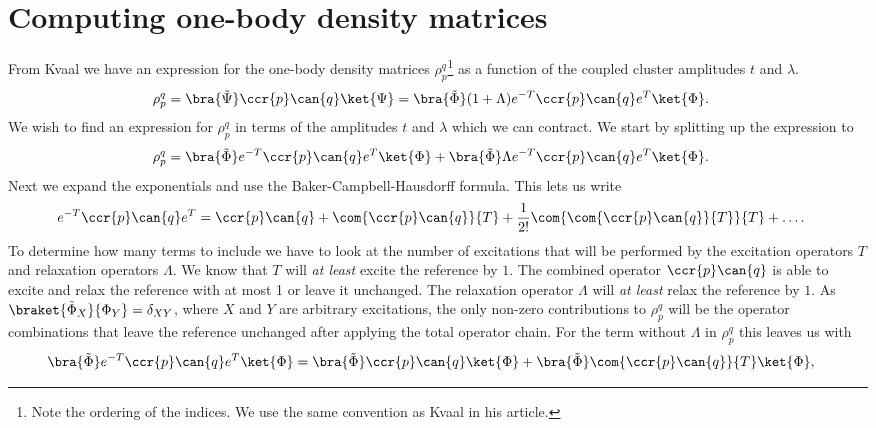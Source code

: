 \chapter{Computing one-body density matrices}
    From Kvaal\cite{kvaal2012ab} we have an expression for the one-body density
    matrices $\rho^q_p$\footnote{Note the ordering of the indices. We use the
    same convention as Kvaal in his article.} as a function of the coupled
    cluster amplitudes $t$ and $\lambda$.
    \begin{align}
        \rho^{q}_{p}
        &= \bra{\tilde{\Psi}}\ccr{p}\can{q}\ket{\Psi}
        = \bra{\tilde{\Phi}}(1 + \Lambda)e^{-T}\ccr{p}\can{q}e^T\ket{\Phi}.
    \end{align}
    We wish to find an expression for $\rho^{q}_{p}$ in terms of the amplitudes
    $t$ and $\lambda$ which we can contract. We start by splitting up the
    expression to
    \begin{align}
        \rho^q_p
        &= \bra{\tilde{\Phi}}e^{-T}\ccr{p}\can{q}e^T\ket{\Phi}
        + \bra{\tilde{\Phi}}\Lambda e^{-T}\ccr{p}\can{q}e^T\ket{\Phi}.
    \end{align}
    Next we expand the exponentials and use the Baker-Campbell-Hausdorff
    formula. This lets us write
    \begin{align}
        e^{-T}\ccr{p}\can{q}e^T
        &= \ccr{p}\can{q}
        + \com{\ccr{p}\can{q}}{T}
        + \frac{1}{2!}\com{\com{\ccr{p}\can{q}}{T}}{T}
        + \dots.
    \end{align}
    To determine how many terms to include we have to look at the number of
    excitations that will be performed by the excitation operators $T$ and
    relaxation operators $\Lambda$. We know that $T$ will \textit{at least}
    excite the reference by $1$. The combined operator $\ccr{p}\can{q}$ is able
    to excite and relax the reference with at most 1 or leave it unchanged. The
    relaxation operator $\Lambda$ will \textit{at least} relax the reference by
    $1$. As $\braket{\tilde{\Phi}_X}{\Phi_Y} = \delta_{XY}$, where $X$ and $Y$
    are arbitrary excitations, the only non-zero contributions to $\rho^q_p$
    will be the operator combinations that leave the reference unchanged after
    applying the total operator chain. For the term without $\Lambda$ in
    $\rho^q_p$ this leaves us with
    \begin{align}
        \bra{\tilde{\Phi}}e^{-T}\ccr{p}\can{q}e^T\ket{\Phi}
        &= \bra{\tilde{\Phi}}\ccr{p}\can{q}\ket{\Phi}
        + \bra{\tilde{\Phi}}\com{\ccr{p}\can{q}}{T}\ket{\Phi},
    \end{align}
